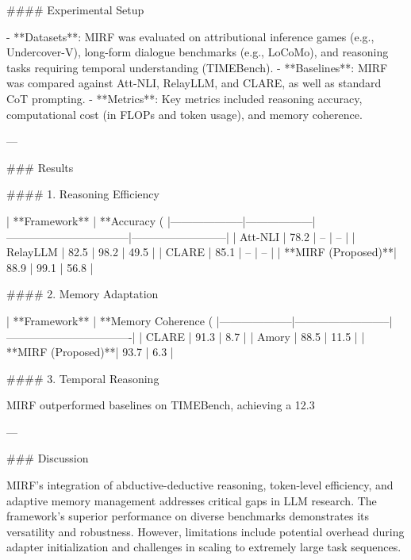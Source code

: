 #### Experimental Setup

- **Datasets**: MIRF was evaluated on attributional inference games (e.g., Undercover-V), long-form dialogue benchmarks (e.g., LoCoMo), and reasoning tasks requiring temporal understanding (TIMEBench).
- **Baselines**: MIRF was compared against Att-NLI, RelayLLM, and CLARE, as well as standard CoT prompting.
- **Metrics**: Key metrics included reasoning accuracy, computational cost (in FLOPs and token usage), and memory coherence.

---

### Results

#### 1. Reasoning Efficiency

| **Framework**     | **Accuracy (%
|--------------------|------------------|---------------------------------|--------------------------|
| Att-NLI            | 78.2            | --                             | --                       |
| RelayLLM           | 82.5            | 98.2                           | 49.5                    |
| CLARE              | 85.1            | --                             | --                       |
| **MIRF (Proposed)**| 88.9            | 99.1                           | 56.8                    |

#### 2. Memory Adaptation

| **Framework**     | **Memory Coherence (%
|--------------------|--------------------------|----------------------------------|
| CLARE             | 91.3                     | 8.7                              |
| Amory             | 88.5                     | 11.5                             |
| **MIRF (Proposed)**| 93.7                     | 6.3                              |

#### 3. Temporal Reasoning

MIRF outperformed baselines on TIMEBench, achieving a 12.3%

---

### Discussion

MIRF's integration of abductive-deductive reasoning, token-level efficiency, and adaptive memory management addresses critical gaps in LLM research. The framework's superior performance on diverse benchmarks demonstrates its versatility and robustness. However, limitations include potential overhead during adapter initialization and challenges in scaling to extremely large task sequences.

